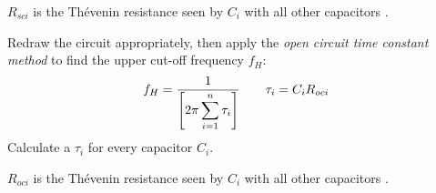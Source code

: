 \begin{CheatsheetEntryFrame}
\begin{MulticolsSoftSepRule}{2}
        $R_{sci}$ is the Th\'evenin resistance seen by $C_i$ \linebreak with all other capacitors \textbf{}.

        \bigskip
        \SoftHLine
        \bigskip


        Redraw the circuit appropriately, then apply the \linebreak \emph{open circuit time constant method} to find the \linebreak upper cut-off frequency $f_H$:
        \begin{gather*}
            f_H
            = \frac{1}{
                \displaystyle
                \brackets*{
                    2 \pi \sum_{i=1}^n \tau_i
                }
            }
            \qquad
            \tau_i = C_i R_{oci}
        \end{gather*}
        Calculate a $\tau_i$ for every capacitor $C_i$.

        $R_{oci}$ is the Th\'evenin resistance seen by $C_i$ \linebreak with all other capacitors \textbf{}.
        
    \end{MulticolsSoftSepRule}
\end{CheatsheetEntryFrame}

